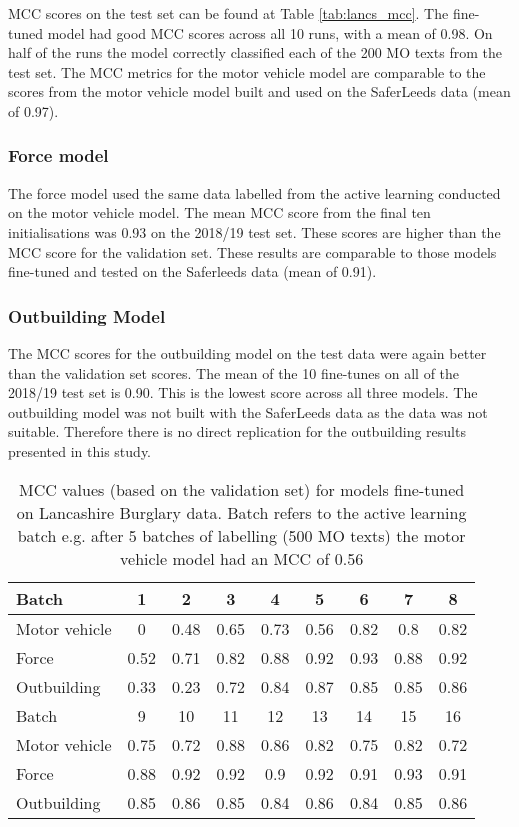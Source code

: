 MCC scores on the test set can be found at Table \ref{tab:lancs_mcc}. The fine-tuned model had good MCC scores across all 10 runs, with a mean of 0.98. On half of the runs the model correctly classified each of the 200 MO texts from the test set. The MCC metrics for the motor vehicle model are comparable to the scores from the motor vehicle model built and used on the SaferLeeds data (mean of 0.97). 

\subsubsection{Force model} The force model used the same data labelled from the active learning conducted on the motor vehicle model. The mean MCC score from the final ten initialisations was 0.93 on the 2018/19 test set. These scores are higher than the MCC score for the validation set. These results are comparable to  those models fine-tuned and tested on the Saferleeds data (mean of 0.91). 


\subsubsection{Outbuilding Model} The MCC scores for the outbuilding model on the test data were again better than the validation set scores. The mean of the 10 fine-tunes on all of the 2018/19 test set is 0.90. This is the lowest score across all three models. The outbuilding model was not built with the SaferLeeds data as the data was not suitable. Therefore there is no direct replication for the outbuilding results presented in this study.


\begin{table}[]
\centering
\begin{tabular}{@{}lcccccccc@{}}
\toprule
Batch       & 1    & 2    & 3    & 4    & 5    & 6    & 7    & 8    \\ \midrule
Motor vehicle          & 0    & 0.48 & 0.65 & 0.73 & 0.56 & 0.82 & 0.8  & 0.82 \\
Force       & 0.52 & 0.71 & 0.82 & 0.88 & 0.92 & 0.93 & 0.88 & 0.92 \\
Outbuilding & 0.33 & 0.23 & 0.72 & 0.84 & 0.87 & 0.85 & 0.85 & 0.86 \\\midrule
Batch       & 9    & 10   & 11   & 12   & 13   & 14   & 15   & 16   \\\midrule
Motor vehicle         & 0.75 & 0.72 & 0.88 & 0.86 & 0.82 & 0.75 & 0.82 & 0.72 \\
Force       & 0.88 & 0.92 & 0.92 & 0.9  & 0.92 & 0.91 & 0.93 & 0.91 \\
Outbuilding & 0.85 & 0.86 & 0.85 & 0.84 & 0.86 & 0.84 & 0.85 & 0.86 \\ \bottomrule
\end{tabular}
\caption{\label{tab:results_1c}MCC values (based on the validation set) for models fine-tuned on Lancashire Burglary data. Batch refers to the active learning batch e.g. after 5 batches of labelling (500 MO texts) the motor vehicle model had an MCC of 0.56 }
\end{table}



